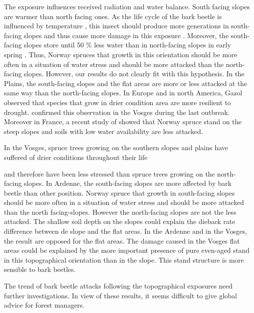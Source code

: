 \documentclass[3p,procedia]{elsarticle}
\begin{document}
The exposure  influences received radiation and water balance.
South facing slopes are warmer than north facing ones.
As the life cycle of the bark beetle is influenced by temperature \citep{baier_phenipscomprehensive_2007},
this insect should produce more generations in south-facing slopes and thus cause  more damage in this exposure \citep{jakus_1995}.
Moreover, the south-facing slopes store until 50 \% less water than in north-facing slopes in early spring \citep{Rouse_1969}.
Thus, Norway spruces that growth in this orientation should be more often in a situation of water stress and should be more attacked than the north-facing slopes.
However, our results do not  clearly fit with this hypothesis. In the Plains, the south-facing slopes and the flat areas are more or less attacked at the same way than the north-facing slopes. In Europe and in north America, Gazol \citep{gazol_2017} observed that species that grow in drier condition area are more resilient to drought.
 \cite{piedallu_spatial_2022} confirmed this observation in the Vosges during the last outbreak.
Moreover in France, a recent study of \cite{nardi_drought_2022} showed that Norway spruce stand on the steep slopes and soils with low water availability are less attacked.



In the Vosges, spruce trees growing on the southern slopes and plains have suffered of drier conditions throughout their life 






and therefore have been less stressed than spruce trees growing on the north-facing slopes.
In Ardenne, the south-facing slopes are more affected by bark beetle than other position.
Norway spruce that growth in south-facing slopes should be more often in a situation of water stress and should be more attacked than the north facing-slopes.
However the north-facing slopes are not the less attacked. 
The shallow soil depth on the slopes could explain the dieback rate difference between de slope and the flat areas. 
In the Ardenne and in the Vosges, the result are opposed for the flat areas.
The damage caused in the Vosges flat areas  could be explained by the more important presence of pure even-aged stand in this topographical orientation than in the slope.
This stand structure is more sensible to bark beetles.

The trend of bark beetle attacks following the topographical exposures need further investigations.
In view of these results, it seems difficult to give global advice for forest managers.
\end{document}
